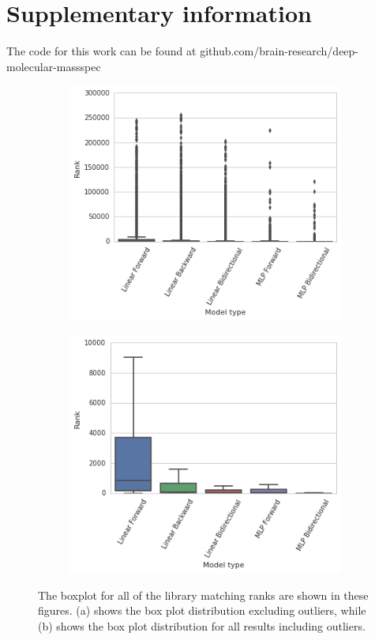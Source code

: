\section{Supplementary information}
The code for this work can be found at github.com/brain-research/deep-molecular-massspec


\begin{figure}
  \centering
    \begin{subfigure}[b]{0.48\linewidth}
        \includegraphics[width=\linewidth]{./model_all_results_boxplot_outliers.png}
        \caption{}
    \end{subfigure}
    \begin{subfigure}[b]{0.48\linewidth}
        \includegraphics[width=\linewidth]{./model_all_results_boxplot.png}
        \caption{}
    \end{subfigure}
  \caption[Box Plot of Library Match Ranking Results]{
  The boxplot for all of the library matching ranks are shown in these figures.
  (a) shows the box plot distribution excluding outliers, while (b) shows the box plot distribution for all results including outliers.
  }
\end{figure}

